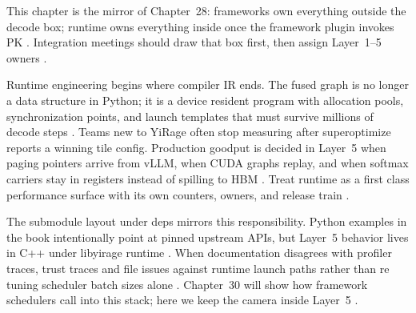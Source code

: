This chapter is the mirror of Chapter~28: frameworks own everything outside the decode box; runtime owns everything inside once the framework plugin invokes PK \citep{kwon2023vllm,yirage2026,chen2020compilerbasedhardw,patel2025llminference,taxbreak2026,memoryfloor2026,nvidia2024cudagraphs,dao2022flashattention,liu2024deepseekv3,semianalysis2024tma,amd2024xdna,amd2024aie,dao2023flashdecoding,nvidia2022hopper,dlbook}. Integration meetings should draw that box first, then assign Layer~1--5 owners \citep{patel2025llminference,yirage2026,chen2020compilerbasedhardw,kwon2023vllm,taxbreak2026,memoryfloor2026,dlbook}.

Runtime engineering begins where compiler IR ends. The fused graph is no longer a data structure in Python; it is a device resident program with allocation pools, synchronization points, and launch templates that must survive millions of decode steps \citep{yirage2026,chen2020compilerbasedhardw,patel2025llminference,dlbook}. Teams new to YiRage often stop measuring after superoptimize reports a winning tile config. Production goodput is decided in Layer~5 when paging pointers arrive from vLLM, when CUDA graphs replay, and when softmax carriers stay in registers instead of spilling to HBM \citep{kwon2023vllm,memoryfloor2026,dao2022flashattention,yirage2026,chen2020compilerbasedhardw,patel2025llminference,taxbreak2026,nvidia2024cudagraphs,dlbook}. Treat runtime as a first class performance surface with its own counters, owners, and release train \citep{taxbreak2026,memoryfloor2026,patel2025llminference,yirage2026,chen2020compilerbasedhardw,kwon2023vllm,dlbook}.

The submodule layout under deps mirrors this responsibility. Python examples in the book intentionally point at pinned upstream APIs, but Layer~5 behavior lives in C++ under libyirage runtime \citep{yirage2026,chen2020compilerbasedhardw,patel2025llminference,dlbook}. When documentation disagrees with profiler traces, trust traces and file issues against runtime launch paths rather than re tuning scheduler batch sizes alone \citep{patel2025llminference,yirage2026,chen2020compilerbasedhardw,kwon2023vllm,taxbreak2026,memoryfloor2026,dlbook}. Chapter~30 will show how framework schedulers call into this stack; here we keep the camera inside Layer~5 \citep{yirage2026,chen2020compilerbasedhardw,kwon2023vllm,patel2025llminference,dlbook}.

